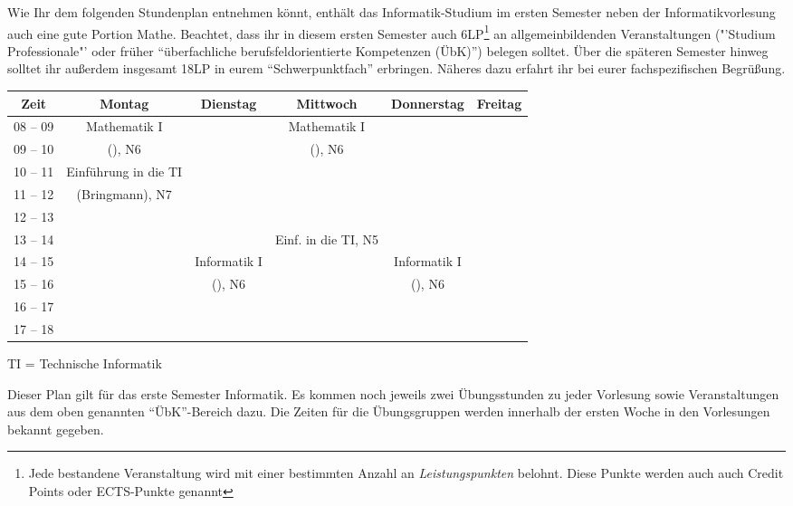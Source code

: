 Wie Ihr dem folgenden Stundenplan entnehmen könnt, enthält das Informatik-Studium im ersten
Semester neben der Informatikvorlesung auch eine gute Portion Mathe. Beachtet, dass ihr
in diesem ersten Semester auch 6LP\footnote{Jede bestandene Veranstaltung wird mit einer bestimmten Anzahl an \emph{Leistungspunkten} belohnt. Diese Punkte werden auch auch Credit Points oder ECTS-Punkte genannt} an allgemeinbildenden Veranstaltungen ("'Studium Professionale"' oder früher "`überfachliche berufsfeldorientierte Kompetenzen (ÜbK)"') belegen solltet.
Über die späteren Semester hinweg solltet ihr außerdem insgesamt 18LP in eurem "`Schwerpunktfach"' erbringen. Näheres dazu erfahrt ihr bei eurer fachspezifischen Begrüßung.

\begin{minipage}{\textwidth}
    \footnotesize
\begin{center}
	\begin{tabular}{|c|c|c|c|c|c|} \hline
		Zeit      & 			Montag 		& Dienstag			& Mittwoch 		    	& Donnerstag 			& Freitag   \\
		\hline\hline
		08 -- 09  & 		Mathematik I 	&  					& Mathematik I 		    &  						&			\\
		\cline{1-1}\cline{3-3}\cline{5-6}
		09 -- 10  & 		(\Matheprof), N6& 					& (\Matheprof), N6      &  						&			\\
		\hline
		10 -- 11  &	Einführung in die TI	&					&				    	&						&			\\
		\cline{1-1}\cline{3-6}
		11 -- 12 & 	(Bringmann), N7			&  					&					    &			 			& 			\\
		\hline
		12 -- 13 & 							& 				 	& 				        & 						& 			\\
		\hline
		13 -- 14 & 							& 					& Einf. in die TI, N5	& 						& 			\\
		\hline
		14 -- 15 & 							& Informatik I 		& 				    	& Informatik I 			& 			\\
		\cline{1-2}\cline{4-4}\cline{6-6}
		15 -- 16 &							 & (\Infoprof), N6 	& 					    & (\Infoprof), N6 		& 			\\
		\hline
		16 -- 17 & & & & &\\
		\hline
		17 -- 18 & & & & & \\
		\hline
	\end{tabular}
	
\scriptsize TI = Technische Informatik

\end{center}
\end{minipage}
Dieser Plan gilt für das erste Semester Informatik. Es kommen noch jeweils zwei Übungsstunden zu jeder Vorlesung 
sowie Veranstaltungen aus dem oben genannten "`\"UbK"'-Bereich dazu.
Die Zeiten für die Übungsgruppen werden innerhalb der ersten Woche in den Vorlesungen bekannt gegeben.

